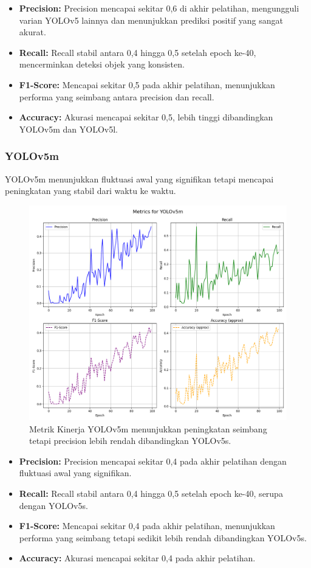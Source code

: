 \documentclass[12pt,a4paper]{article}
\begin{document}
\begin{itemize}
    \item \textbf{Precision:} Precision mencapai sekitar 0,6 di akhir pelatihan, mengungguli varian YOLOv5 lainnya dan menunjukkan prediksi positif yang sangat akurat.
    \item \textbf{Recall:} Recall stabil antara 0,4 hingga 0,5 setelah epoch ke-40, mencerminkan deteksi objek yang konsisten.
    \item \textbf{F1-Score:} Mencapai sekitar 0,5 pada akhir pelatihan, menunjukkan performa yang seimbang antara precision dan recall.
    \item \textbf{Accuracy:} Akurasi mencapai sekitar 0,5, lebih tinggi dibandingkan YOLOv5m dan YOLOv5l.
\end{itemize}

\subsubsection{YOLOv5m}
YOLOv5m menunjukkan fluktuasi awal yang signifikan tetapi mencapai peningkatan yang stabil dari waktu ke waktu.  

\begin{figure}[H]
    \centering
    \includegraphics[width=0.6\linewidth]{assets/yolov5m_metrics.png}
    \caption{Metrik Kinerja YOLOv5m menunjukkan peningkatan seimbang tetapi precision lebih rendah dibandingkan YOLOv5s.}
    \label{fig:yolov5m}
\end{figure}

\begin{itemize}
    \item \textbf{Precision:} Precision mencapai sekitar 0,4 pada akhir pelatihan dengan fluktuasi awal yang signifikan.
    \item \textbf{Recall:} Recall stabil antara 0,4 hingga 0,5 setelah epoch ke-40, serupa dengan YOLOv5s.
    \item \textbf{F1-Score:} Mencapai sekitar 0,4 pada akhir pelatihan, menunjukkan performa yang seimbang tetapi sedikit lebih rendah dibandingkan YOLOv5s.
    \item \textbf{Accuracy:} Akurasi mencapai sekitar 0,4 pada akhir pelatihan.
\end{itemize}
\end{document}
